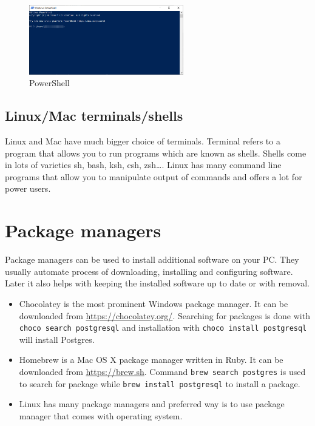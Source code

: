 \begin{figure}[htbp]
    \centering
    \includegraphics[width=0.6\textwidth]{images/powershell}
    \caption{PowerShell\label{fig:PowerShell}}
\end{figure}

\subsection{Linux/Mac terminals/shells}\label{subsec:linux/mac-terminals/shells}

Linux and Mac have much bigger choice of terminals.
Terminal refers to a program that allows you to run programs which are known as shells.
Shells come in lots of varieties sh, bash, ksh, csh, zsh\dots.
Linux has many command line programs that allow you to manipulate output of commands and offers a lot for power users.


\section{Package managers}\label{sec:package-managers}

Package managers can be used to install additional software on your PC. They usually automate process of
downloading, installing and configuring software.
Later it also helps with keeping the installed software up to date or with removal.

\begin{itemize}[leftmargin=*]
    \item Chocolatey is the most prominent Windows package manager.
    It can be downloaded from \href{https://chocolatey.org/}{https://chocolatey.org/}.
          Searching for packages is done with \texttt{choco search postgresql}
          and installation with \texttt{choco install postgresql} will install Postgres.
    \item Homebrew is a Mac OS X package manager written in Ruby.
          It can be downloaded from \href{https://brew.sh}{https://brew.sh}.
          Command \texttt{brew search postgres}
          is used to search for package while \texttt{brew install postgresql} to install a package.
    \item Linux has many package managers and preferred way is to use package manager
          that comes with operating system.
\end{itemize}